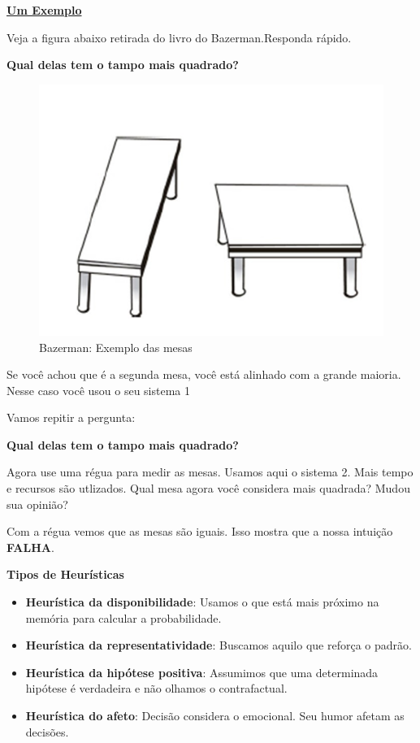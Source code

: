 \documentclass[
  letterpaper,
  DIV=11,
  numbers=noendperiod]{scrreprt}
\begin{document}
\ul{\textbf{Um Exemplo}}

Veja a figura abaixo retirada do livro do Bazerman.Responda rápido.

\textbf{Qual delas tem o tampo mais quadrado?}

\begin{figure}[H]

{\centering \includegraphics[width=0.8\linewidth,height=\textheight,keepaspectratio]{figuras/mesa.jpg}

}

\caption{Bazerman: Exemplo das mesas}

\end{figure}%

Se você achou que é a segunda mesa, você está alinhado com a grande
maioria. Nesse caso você usou o seu sistema 1

Vamos repitir a pergunta:

\textbf{Qual delas tem o tampo mais quadrado?}

Agora use uma régua para medir as mesas. Usamos aqui o sistema 2. Mais
tempo e recursos são utlizados. Qual mesa agora você considera mais
quadrada? Mudou sua opinião?

Com a régua vemos que as mesas são iguais. Isso mostra que a nossa
intuição \textbf{FALHA}.

\textbf{Tipos de Heurísticas}

\begin{itemize}
\item
  \textbf{Heurística da disponibilidade}: Usamos o que está mais próximo
  na memória para calcular a probabilidade.
\item
  \textbf{Heurística da representatividade}: Buscamos aquilo que reforça
  o padrão.
\item
  \textbf{Heurística da hipótese positiva}: Assumimos que uma
  determinada hipótese é verdadeira e não olhamos o contrafactual.
\item
  \textbf{Heurística do afeto}: Decisão considera o emocional. Seu humor
  afetam as decisões.
\end{itemize}
\end{document}
